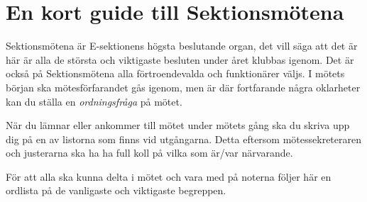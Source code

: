 \documentclass[../_main/handlingar.tex]{subfiles}
\begin{document}
\section{En kort guide till Sektionsmötena}
Sektionsmötena är E-sektionens högsta beslutande organ, det vill säga att det är här är alla de största och viktigaste besluten under året klubbas igenom. Det är också på Sektionsmötena alla förtroendevalda och funktionärer väljs. I mötets början ska mötesförfarandet gås igenom, men är där fortfarande några oklarheter kan du ställa en \emph{ordningsfråga} på mötet.

När du lämnar eller ankommer till mötet under mötets gång ska du skriva upp dig på en av listorna som finns vid utgångarna. Detta eftersom mötessekreteraren och justerarna ska ha ha full koll på vilka som är/var närvarande.

För att alla ska kunna delta i mötet och vara med på noterna följer här en ordlista på de vanligaste och viktigaste begreppen.
\end{document}
